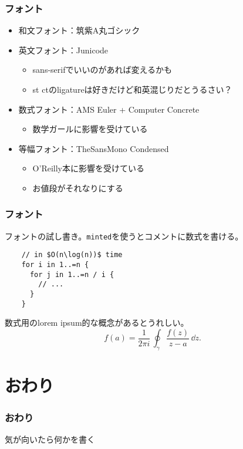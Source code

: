\documentclass[
  lualatex,
  ja=standard,
  compress,
  hyperref={colorlinks, urlcolor=magenta, linkcolor=blue!55!black},
  dvipsnames,
  svgnames,
]{beamer}
\newcommand{\jaen}[1]{{\tsukuard #1}}
\begin{document}
\setcounter{slidetopic}{0}
\begin{frame}
  \frametitle{フォント \theslidetopic}

  \begin{itemize}
  \item 和文フォント：筑紫\jaen{A}丸ゴシック
  \item 英文フォント：Junicode
    \begin{itemize}
    \item sans-serifでいいのがあれば変えるかも
    \item st ctのligatureは好きだけど和英混じりだとうるさい？
    \end{itemize}
  \item 数式フォント：AMS Euler + Computer Concrete
    \begin{itemize}
    \item 数学ガールに影響を受けている
    \end{itemize}
  \item 等幅フォント：TheSansMono Condensed
    \begin{itemize}
    \item O'Reilly本に影響を受けている
    \item お値段がそれなりにする
    \end{itemize}
  \end{itemize}
\end{frame}

\begin{frame}[fragile]
  \frametitle{フォント \theslidetopic}

  フォントの試し書き。\texttt{minted}を使うとコメントに数式を書ける。
  \begin{verbatim}
    // in $O(n\log(n))$ time
    for i in 1..=n {
      for j in 1..=n / i {
        // ...
      }
    }
  \end{verbatim}

  数式用のlorem ipsum的な概念があるとうれしい。
  $$
  f(a) = \frac{1}{2\pi i}\, \oint_{\gamma} \frac{f(z)}{z-a}\, \dd{z}.
  $$
\end{frame}

\section{おわり}
\begin{frame}
  \frametitle{おわり}

  気が向いたら何かを書く
\end{frame}

\begin{frame}
  \vspace{3em}
  \Thankyou
\end{frame}
\end{document}
